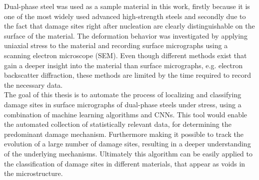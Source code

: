 Dual-phase steel was used as a sample material in this work, firstly because it is one of the most widely used advanced high-strength steels and secondly due to the fact that damage sites right after nucleation are clearly distinguishable on the surface of the material. The deformation behavior was investigated by applying uniaxial stress to the material and recording surface micrographs using a scanning electron microscope (SEM). Even though different methods exist that gain a deeper insight into the material than surface micrographs, e.g. electron backscatter diffraction, these methods are limited by the time required to record the necessary data. \\

The goal of this thesis is to automate the process of localizing and classifying damage sites in surface micrographs of dual-phase steels under stress, using a combination of machine learning algorithms and CNNs. This tool would enable the automated collection of statistically relevant data, for determining the predominant damage mechanism. Furthermore making it possible to track the evolution of a large number of damage sites, resulting in a deeper understanding of the underlying mechanisms. Ultimately this algorithm can be easily applied to the classification of damage sites in different materials, that appear as voids in the microstructure. \\

%



